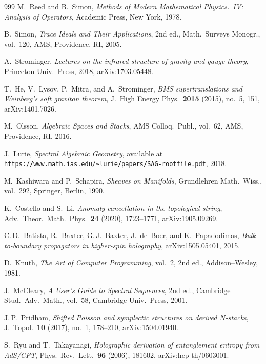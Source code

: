 \documentclass[11pt]{memoir}
\begin{document}
\begin{thebibliography}{999}
M.~Reed and B.~Simon, \emph{Methods of Modern Mathematical Physics.~IV: Analysis of Operators}, Academic Press, New York, 1978.

B.~Simon, \emph{Trace Ideals and Their Applications}, 2nd ed., Math.\ Surveys Monogr., vol.~120, AMS, Providence, RI, 2005.

A.~Strominger, \emph{Lectures on the infrared structure of gravity and gauge theory}, Princeton Univ.\ Press, 2018, arXiv:1703.05448.

T.~He, V.~Lysov, P.~Mitra, and A.~Strominger, \emph{BMS supertranslations and Weinberg's soft graviton theorem}, J.\ High Energy Phys.\ \textbf{2015} (2015), no.~5, 151, arXiv:1401.7026.

M.~Olsson, \emph{Algebraic Spaces and Stacks}, AMS Colloq.\ Publ., vol.~62, AMS, Providence, RI, 2016.

J.~Lurie, \emph{Spectral Algebraic Geometry}, available at \texttt{https://www.math.ias.edu/\~{}lurie/papers/SAG-rootfile.pdf}, 2018.

M.~Kashiwara and P.~Schapira, \emph{Sheaves on Manifolds}, Grundlehren Math.\ Wiss., vol.~292, Springer, Berlin, 1990.

K.~Costello and S.~Li, \emph{Anomaly cancellation in the topological string}, Adv.\ Theor.\ Math.\ Phys.\ \textbf{24} (2020), 1723--1771, arXiv:1905.09269.

C.\,D.~Batista, R.~Baxter, G.\,J.~Baxter, J.~de~Boer, and K.~Papadodimas, \emph{Bulk-to-boundary propagators in higher-spin holography}, arXiv:1505.05401, 2015.

D.~Knuth, \emph{The Art of Computer Programming}, vol.~2, 2nd ed., Addison--Wesley, 1981.

J.~McCleary, \emph{A User's Guide to Spectral Sequences}, 2nd ed., Cambridge Stud.\ Adv.\ Math., vol.~58, Cambridge Univ.\ Press, 2001.

J.\,P.~Pridham, \emph{Shifted Poisson and symplectic structures on derived $N$-stacks}, J.\ Topol.\ \textbf{10} (2017), no.~1, 178--210, arXiv:1504.01940.

S.~Ryu and T.~Takayanagi, \emph{Holographic derivation of entanglement entropy from AdS/CFT}, Phys.\ Rev.\ Lett.\ \textbf{96} (2006), 181602, arXiv:hep-th/0603001.


\end{thebibliography}
\end{document}
